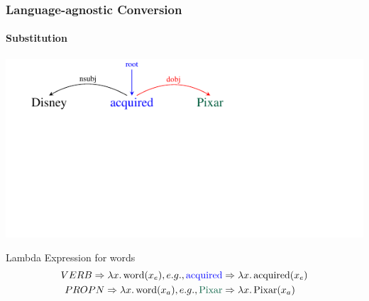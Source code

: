 \documentclass[mathserif,12pt]{beamer}
\newcommand{\lspace}{.\,}
\begin{document}
\begin{frame}[noframenumbering]
\frametitle{Language-agnostic Conversion}
\framesubtitle{Substitution}
\vspace{-2.4em}
\begin{center}
\includegraphics[trim=2em 9.4em 10em 0em,clip=true,scale=1.3]{figures/pixar_dobj}

\end{center}

\vspace{1cm}

\begin{block}{\centering Lambda Expression for words}
\vspace{-0.5cm}
\begin{align*}
  VERB \Rightarrow \lambda x \lspace \hbox{word}(x_e), e.g., \hbox{\color{blue} acquired} & \Rightarrow  \lambda x \lspace \hbox{acquired}(x_e)  \\
  PROPN \Rightarrow \lambda x \lspace \hbox{word}(x_a), e.g., \hbox{\color{blue!40!green!60!black} Pixar} & \Rightarrow  \lambda x \lspace \hbox{Pixar}(x_a) 
\end{align*}
\vspace{-0.5cm}
\end{block}
\end{frame}
\end{document}
